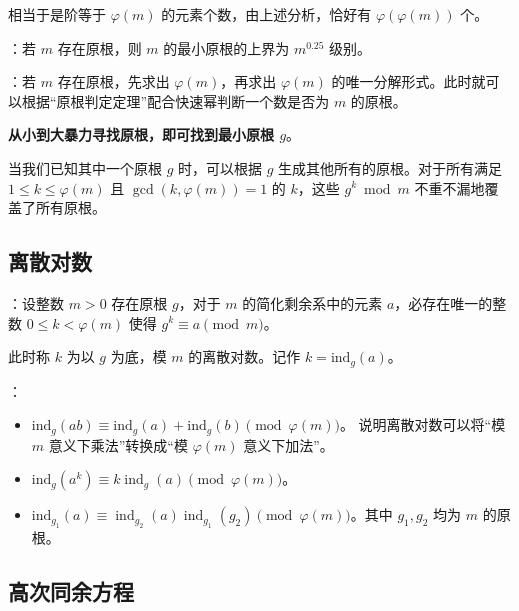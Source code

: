 \begin{quoteblock}
相当于是阶等于 $\varphi(m)$ 的元素个数，由上述分析，恰好有 $\varphi(\varphi(m))$ 个。
\end{quoteblock}

：若 $m$ 存在原根，则 $m$ 的最小原根的上界为 $m^{0.25}$ 级别。

：若 $m$ 存在原根，先求出 $\varphi(m)$，再求出 $\varphi(m)$ 的唯一分解形式。此时就可以根据“原根判定定理”配合快速幂判断一个数是否为 $m$ 的原根。

\textbf{从小到大暴力寻找原根，即可找到最小原根 $g$}。

当我们已知其中一个原根 $g$ 时，可以根据 $g$ 生成其他所有的原根。对于所有满足 $1 \leq k \leq \varphi(m)$ 且 $\gcd(k, \varphi(m)) = 1$ 的 $k$，这些 $g^k \bmod m$ 不重不漏地覆盖了所有原根。



\subsection{离散对数}

：设整数 $m > 0$ 存在原根 $g$，对于 $m$ 的简化剩余系中的元素 $a$，必存在唯一的整数 $0 \leq k < \varphi(m)$ 使得 $g^k \equiv a \pmod m$。

此时称 $k$ 为以 $g$ 为底，模 $m$ 的离散对数。记作 $k = \mathrm{ind}_g(a)$。

：

\begin{itemize}
    \item $\mathrm{ind}_g(ab) \equiv \mathrm{ind}_g(a) + \mathrm{ind}_g(b) \pmod{\varphi(m)}$。\newline{}
    说明离散对数可以将“模 $m$ 意义下乘法”转换成“模 $\varphi(m)$ 意义下加法”。
    \item $\mathrm{ind}_g(a^k) \equiv k\operatorname{ind}_g(a) \pmod{\varphi(m)}$。
    \item $\mathrm{ind}_{g_1}(a) \equiv \operatorname{ind}_{g_2}(a) \operatorname{ind}_{g_1}(g_2) \pmod{\varphi(m)}$。其中 $g_1, g_2$ 均为 $m$ 的原根。
\end{itemize}

\subsection{高次同余方程}


